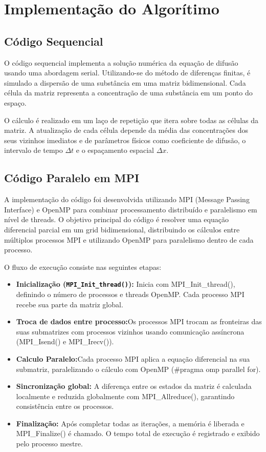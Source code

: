 \documentclass[12pt]{article}
\begin{document}
\section{Implementação do Algorítimo}

\subsection{Código Sequencial}

O código sequencial implementa a solução numérica da equação de difusão usando
uma abordagem serial. Utilizando-se do método de diferenças finitas, é simulado
a dispersão de uma substância em uma matriz bidimensional. Cada célula da
matriz representa a concentração de uma substância em um ponto do espaço.

O cálculo é realizado em um laço de repetição que itera sobre todas as células
da matriz. A atualização de cada célula depende da média das concentrações dos
seus vizinhos imediatos e de parâmetros físicos como coeficiente de difusão, o
intervalo de tempo $\Delta t$ e o espaçamento espacial $\Delta x$.

\subsection{Código Paralelo em MPI}

A implementação do código foi desenvolvida utilizando MPI (Message Passing Interface) e OpenMP para combinar processamento distribuído e paralelismo em nível de threads. O objetivo principal do código é resolver uma equação diferencial parcial em um grid bidimensional, distribuindo os cálculos entre múltiplos processos MPI e utilizando OpenMP para paralelismo dentro de cada processo.

O fluxo de execução consiste nas seguintes etapas:

\begin{itemize}
    \item \textbf{Inicialização (\texttt{MPI\_Init\_thread()}):} Inicia com MPI\_Init\_thread(), definindo o número de processos e threads OpenMP. Cada processo MPI recebe sua parte da matriz global.
    \item \textbf{Troca de dados entre processo:}Os processos MPI trocam as fronteiras das suas submatrizes com processos vizinhos usando comunicação assíncrona (MPI\_Isend() e MPI\_Irecv()).
    \item \textbf{Calculo Paralelo:}Cada processo MPI aplica a equação diferencial na sua submatriz, paralelizando o cálculo com OpenMP (\#pragma omp parallel for).
    \item \textbf{Sincronização global:} A diferença entre os estados da matriz é calculada localmente e reduzida globalmente com MPI\_Allreduce(), garantindo consistência entre os processos.
     \item \textbf{Finalização:} Após completar todas as iterações, a memória é liberada e MPI\_Finalize() é chamado. O tempo total de execução é registrado e exibido pelo processo mestre.


\end{itemize}
\end{document}
